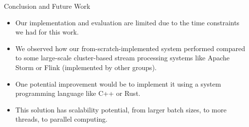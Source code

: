 \documentclass[9pt]{beamer}
\begin{document}
\begin{frame}[fragile]{Conclusion and Future Work}
    \begin{itemize}
        \item Our implementation and evaluation are limited due to the time constraints we had for this work.
        
        \item We observed how our from-scratch-implemented system performed compared to some large-scale cluster-based stream processing systems like Apache Storm or Flink (implemented by other groups).
        
        \item One potential improvement would be to implement it using a system programming language like C++ or Rust.
        
        \item This solution has scalability potential, from larger batch sizes, to more threads, to parallel computing. 
    \end{itemize}

    
    

\end{frame}
\end{document}
